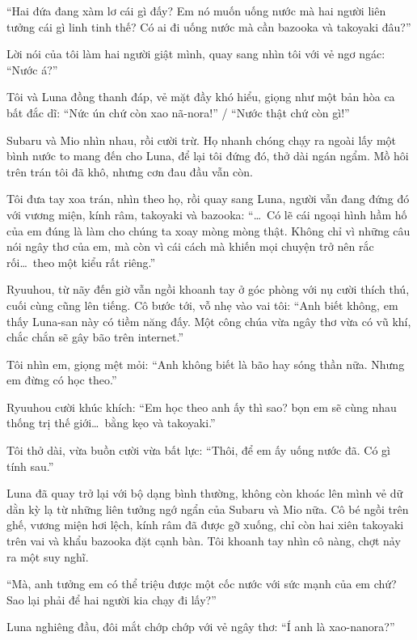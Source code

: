 \documentclass[../main.tex]{subfiles}
\begin{document}
``Hai đứa đang xàm lơ cái gì đấy? Em nó muốn uống nước mà hai người liên tưởng cái gì linh tinh thế? Có ai đi uống nước mà cần bazooka và takoyaki đâu?''

Lời nói của tôi làm hai người giật mình, quay sang nhìn tôi với vẻ ngơ ngác: ``Nước á?''

Tôi và Luna đồng thanh đáp, vẻ mặt đầy khó hiểu, giọng như một bản hòa ca bất đắc dĩ: ``Nức ún chứ còn xao nã-nora!'' / ``Nước thật chứ còn gì!''

Subaru và Mio nhìn nhau, rồi cười trừ. Họ nhanh chóng chạy ra ngoài lấy một bình nước to mang đến cho Luna, để lại tôi đứng đó, thở dài ngán ngẩm. Mồ hôi trên trán tôi đã khô, nhưng cơn đau đầu vẫn còn.

Tôi đưa tay xoa trán, nhìn theo họ, rồi quay sang Luna, người vẫn đang đứng đó với vương miện, kính râm, takoyaki và bazooka: ``\dots\ Có lẽ cái ngoại hình hầm hố của em đúng là làm cho chúng ta xoay mòng mòng thật. Không chỉ vì những câu nói ngây thơ của em, mà còn vì cái cách mà khiến mọi chuyện trở nên rắc rối\dots\ theo một kiểu rất riêng.''

Ryuuhou, từ nãy đến giờ vẫn ngồi khoanh tay ở góc phòng với nụ cười thích thú, cuối cùng cũng lên tiếng. Cô bước tới, vỗ nhẹ vào vai tôi: ``Anh biết không, em thấy Luna-san này có tiềm năng đấy. Một công chúa vừa ngây thơ vừa có vũ khí, chắc chắn sẽ gây bão trên internet.''

Tôi nhìn em, giọng mệt mỏi: ``Anh không biết là bão hay sóng thần nữa. Nhưng em đừng có học theo.''

Ryuuhou cười khúc khích: ``Em học theo anh ấy thì sao? bọn em sẽ cùng nhau thống trị thế giới\dots\ bằng kẹo và takoyaki.''

Tôi thở dài, vừa buồn cười vừa bất lực: ``Thôi, để em ấy uống nước đã. Có gì tính sau.''
\omk

Luna đã quay trở lại với bộ dạng bình thường, không còn khoác lên mình vẻ dữ dằn kỳ lạ từ những liên tưởng ngớ ngẩn của Subaru và Mio nữa. Cô bé ngồi trên ghế, vương miện hơi lệch, kính râm đã được gỡ xuống, chỉ còn hai xiên takoyaki trên vai và khẩu bazooka đặt cạnh bàn. Tôi khoanh tay nhìn cô nàng, chợt nảy ra một suy nghĩ.

``Mà, anh tưởng em có thể triệu được một cốc nước với sức mạnh của em chứ? Sao lại phải để hai người kia chạy đi lấy?''

Luna nghiêng đầu, đôi mắt chớp chớp với vẻ ngây thơ: ``Í anh là xao-nanora?''
\end{document}
